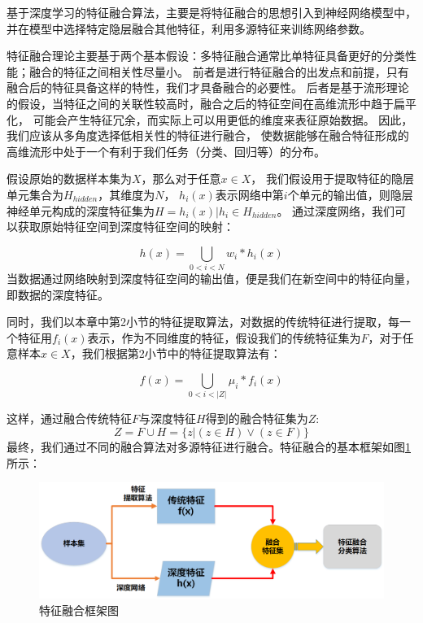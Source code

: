 基于深度学习的特征融合算法，主要是将特征融合的思想引入到神经网络模型中，
并在模型中选择特定隐层融合其他特征，利用多源特征来训练网络参数。\par

特征融合理论主要基于两个基本假设：多特征融合通常比单特征具备更好的分类性能；融合的特征之间相关性尽量小。
前者是进行特征融合的出发点和前提，只有融合后的特征具备这样的特性，我们才具备融合的必要性。
后者是基于流形理论的假设，当特征之间的关联性较高时，融合之后的特征空间在高维流形中趋于扁平化，
可能会产生特征冗余，而实际上可以用更低的维度来表征原始数据。
因此，我们应该从多角度选择低相关性的特征进行融合，
使数据能够在融合特征形成的高维流形中处于一个有利于我们任务（分类、回归等）的分布。\par

假设原始的数据样本集为$X$，那么对于任意${x \in X}$，
我们假设用于提取特征的隐层单元集合为$H_{hidden}$，其维度为$N$，
$h_i(x)$表示网络中第$i$个单元的输出值，则隐层神经单元构成的深度特征集为$H={h_i(x)|h_i \in H_{hidden}}$。
通过深度网络，我们可以获取原始特征空间到深度特征空间的映射：\par
\begin{equation}
	\label{eqt_4_15}
	h(x) = \bigcup_{0<i<N} w_i * h_{i}(x)
\end{equation}
当数据通过网络映射到深度特征空间的输出值，便是我们在新空间中的特征向量，即数据的深度特征。\par

同时，我们以本章中第2小节的特征提取算法，对数据的传统特征进行提取，每一个特征用$f_{i}(x)$表示，作为不同维度的特征，假设我们的传统特征集为$F$，对于任意样本$x \in X$，我们根据第2小节中的特征提取算法有：\par
\begin{equation}
	\label{eqt_4_16}
	f(x) = \bigcup_{0<i<|Z|}\mu_{i} * f_{i}(x)
\end{equation}

这样，通过融合传统特征$F$与深度特征$H$得到的融合特征集为$Z$:
\begin{equation}
\label{eqt_4_17}
	Z =F \cup H = \{ z | (z \in H) \vee (z \in F) \}
\end{equation}
最终，我们通过不同的融合算法对多源特征进行融合。特征融合的基本框架如图\ref{sec:fig_4_1}所示：

\begin{figure}[!h]
	\centering
	\includegraphics[scale=0.5]{figures/chapter_4/fig_4_1.png}
	\caption{特征融合框架图}\label{sec:fig_4_1}
\end{figure}

